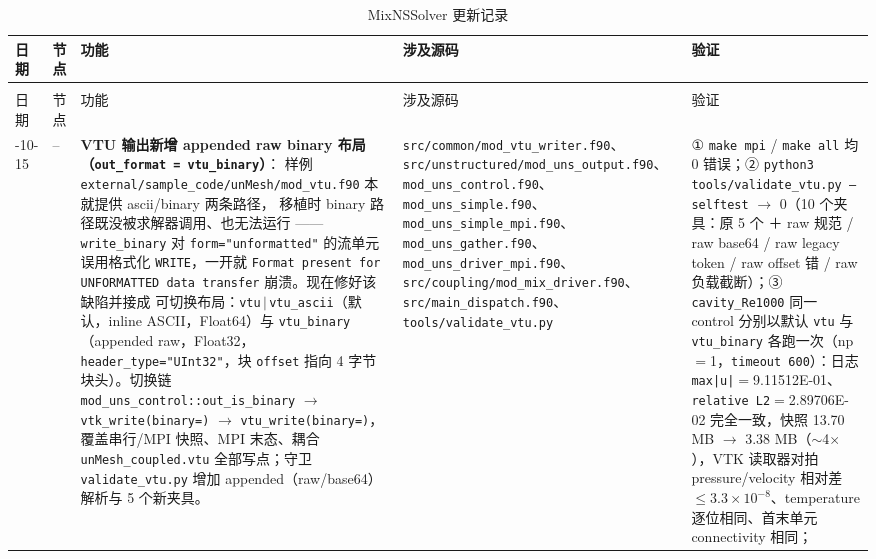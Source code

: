 {\footnotesize
\begin{longtable}{@{}>{\raggedright\arraybackslash}p{}>{\raggedright\arraybackslash}p{}>{\raggedright\arraybackslash}p{}>{\raggedright\arraybackslash}p{}>{\raggedright\arraybackslash}p{}@{}}
\caption{MixNSSolver 更新记录}\label{tab:changelog}\\
\toprule
日期 & 节点 & 功能 & 涉及源码 & 验证 \\
\midrule
\endfirsthead
\multicolumn{5}{@{}l}{\small\itshape 表~\ref{tab:changelog}（续）}\\
\toprule
日期 & 节点 & 功能 & 涉及源码 & 验证 \\
\midrule
\endhead
\bottomrule
\endlastfoot
2026-10-15 & -- &
\textbf{VTU 输出新增 appended raw binary 布局（\texttt{out\_format = vtu\_binary}）}：
样例 \texttt{external/sample\_code/unMesh/mod\_vtu.f90} 本就提供 ascii/binary 两条路径，
移植时 binary 路径既没被求解器调用、也无法运行 —— \texttt{write\_binary} 对
\texttt{form="unformatted"} 的流单元误用格式化 \texttt{WRITE}，一开就
\texttt{Format present for UNFORMATTED data transfer} 崩溃。现在修好该缺陷并接成
可切换布局：\texttt{vtu}$\,|\,$\texttt{vtu\_ascii}（默认，inline ASCII，Float64）与
\texttt{vtu\_binary}（appended raw，Float32，\texttt{header\_type="UInt32"}，块
\texttt{offset} 指向 4 字节块头）。切换链 \texttt{mod\_uns\_control::out\_is\_binary}
$\to$ \texttt{vtk\_write(binary=)} $\to$ \texttt{vtu\_write(binary=)}，覆盖串行/MPI
快照、MPI 末态、耦合 \texttt{unMesh\_coupled.vtu} 全部写点；守卫
\texttt{validate\_vtu.py} 增加 appended（raw/base64）解析与 5 个新夹具。
& \texttt{src/common/mod\_vtu\_writer.f90}、
\texttt{src/unstructured/mod\_uns\_output.f90}、\texttt{mod\_uns\_control.f90}、
\texttt{mod\_uns\_simple.f90}、\texttt{mod\_uns\_simple\_mpi.f90}、
\texttt{mod\_uns\_gather.f90}、\texttt{mod\_uns\_driver\_mpi.f90}、
\texttt{src/coupling/mod\_mix\_driver.f90}、\texttt{src/main\_dispatch.f90}、
\texttt{tools/validate\_vtu.py}
& ① \texttt{make mpi} / \texttt{make all} 均 0 错误；② \texttt{python3 tools/validate\_vtu.py
--selftest} $\to$ 0（10 个夹具：原 5 个 ＋ raw 规范 / raw base64 / raw legacy token /
raw offset 错 / raw 负载截断）；③ \texttt{cavity\_Re1000} 同一 control 分别以默认
\texttt{vtu} 与 \texttt{vtu\_binary} 各跑一次（np$=$1，\texttt{timeout 600}）：日志
\texttt{max|u|}$=$9.11512E-01、\texttt{relative L2}$=$2.89706E-02 完全一致，快照
13.70 MB $\to$ 3.38 MB（$\sim$4$\times$），VTK 读取器对拍 pressure/velocity 相对差
$\le3.3\times10^{-8}$、temperature 逐位相同、首末单元 connectivity 相同；

\end{longtable}}
